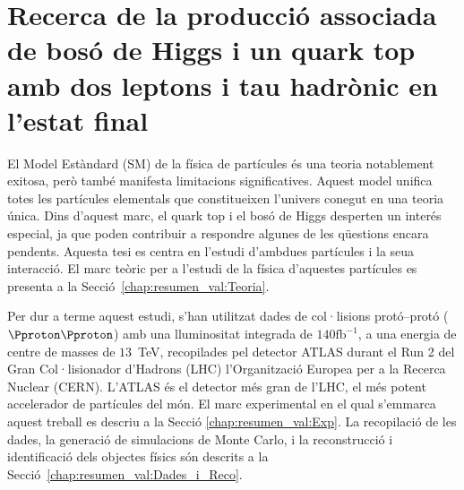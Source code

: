 
\lhead[{\bfseries \thepage}]{ \rightmark}

\label{partIII}


 \renewcommand\thesection{%
 \ifnum\value{betasect}=1%
A%
 \else
\ifnum\value{betasect}=2%
B%
\else
\ifnum\value{betasect}=3%
C%
\else
\ifnum\value{betasect}=4%
D%
\else
 \arabic{section}%
 \fi\fi\fi\fi}%

 \newenvironment{asection}{%
 \setcounter{betasect}{1}%
 }{%
 \setcounter{betasect}{0}%
 }%

 \newenvironment{bsection}{%
 \setcounter{betasect}{2}%
 }{%
 \setcounter{betasect}{0}%
 }%


\setcounter{section}{0}

\chapter*{Recerca de la producció associada de bosó de Higgs i un quark top amb dos leptons i tau hadrònic en l'estat final}
\label{chap:resumen_val}

El Model Estàndard (SM) de la física de partícules és una teoria notablement exitosa, 
però també manifesta limitacions significatives. Aquest model unifica totes les partícules 
elementals que constitueixen l'univers conegut en una teoria única. Dins d'aquest marc, 
el quark $\text{top}$ i el bosó de Higgs desperten un interés especial, ja que poden 
contribuir a respondre algunes de les qüestions encara pendents. Aquesta tesi es 
centra en l'estudi d'ambdues partícules i la seua interacció. El
marc teòric per a l'estudi de la física d'aquestes partícules es presenta a
la Secció~\ref{chap:resumen_val:Teoria}.

Per dur a terme aquest estudi, s'han utilitzat dades de col·lisions protó--protó ($\Pproton \Pproton$) amb una 
lluminositat integrada de $140$$\text{fb}^{-1}$, a una energia de centre de masses de 
$13$~TeV, recopilades pel detector ATLAS durant el Run 2 del Gran Col·lisionador 
d'Hadrons (LHC) l'Organització Europea per a la Recerca Nuclear (CERN). L'ATLAS 
és el detector més gran de l'LHC, el més potent accelerador de partícules del 
món. El marc experimental en el qual s'emmarca aquest treball es descriu a la Secció 
\ref{chap:resumen_val:Exp}. La recopilació de les dades, la generació de simulacions 
de Monte Carlo, i la reconstrucció i identificació dels objectes físics són descrits a
la Secció~\ref{chap:resumen_val:Dades_i_Reco}.

